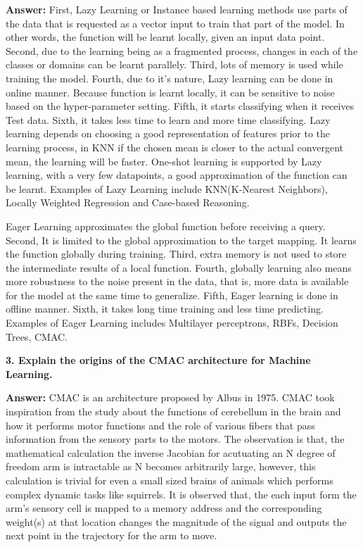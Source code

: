 \documentclass[a4paper, 10pt]{article}
\begin{document}
\textbf{Answer:}
First, Lazy Learning or Instance based learning methods use parts of the data that is requested as a vector input to train that part of the model. In other words, the function will be learnt locally, given an input data point. Second, due to the learning being as a fragmented process, changes in each of the classes or domains can be learnt parallely. Third, lots of memory is used while training the model. Fourth, due to it's nature, Lazy learning can be done in online manner. Because function is learnt locally, it can be sensitive to noise based on the hyper-parameter setting. Fifth, it starts classifying when it receives Test data. Sixth, it takes less time to learn and more time classifying. Lazy learning depends on choosing a good representation of features prior to the learning process, in KNN if the chosen mean is closer to the actual convergent mean, the learning will be faster. One-shot learning is supported by Lazy learning, with a very few datapoints, a good approximation of the function can be learnt.
 Examples of Lazy Learning include KNN(K-Nearest Neighbors), Locally Weighted Regression and Case-based Reasoning. 

Eager Learning approximates the global function before receiving a query. Second, It is limited to the global approximation to the target mapping. It learns the function globally during training. Third, extra memory is not used to store the intermediate results of a local function. Fourth, globally learning also means more robustness to the noise present in the data, that is, more data is available for the model at the same time to generalize. Fifth, Eager learning is done in offline manner. Sixth, it takes long time training and less time predicting.
Examples of Eager Learning includes Multilayer perceptrons, RBFs, Decision Trees, CMAC.

\hfill

\textbf{3. Explain the origins of the CMAC architecture for Machine Learning.}

\textbf{Answer:} 
CMAC is an architecture proposed by Albus in 1975. CMAC took inspiration from the study about the functions of cerebellum in the brain and how it performs motor functions and the role of various fibers that pass information from the sensory parts to the motors. The observation is that, the mathematical calculation the inverse Jacobian for acutuating an N degree of freedom arm is intractable as N becomes arbitrarily large, however, this calculation is trivial for even a small sized brains of animals which performs complex dynamic tasks like squirrels. It is observed that, the each input form the arm's sensory cell is mapped to a memory address and the corresponding weight(s) at that location changes the magnitude of the signal and outputs the next point in the trajectory for the arm to move.
\end{document}
